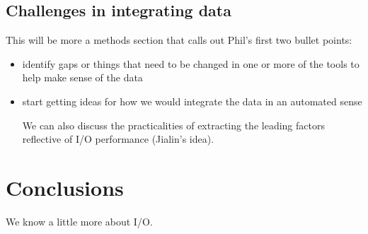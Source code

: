 \documentclass[conference,10pt,compsocconf]{IEEEtran}
\begin{document}
\subsection{Challenges in integrating data}

This will be more a methods section that calls out Phil's first two bullet points:

\begin{itemize}
\item identify gaps or things that need to be changed in one or more of the tools
to help make sense of the data
\item start getting ideas for how we would integrate the data in an automated
sense

We can also discuss the practicalities of extracting the leading factors
reflective of I/O performance (Jialin's idea).
\end{itemize}


\section{Conclusions}

We know a little more about I/O.



\end{document}
